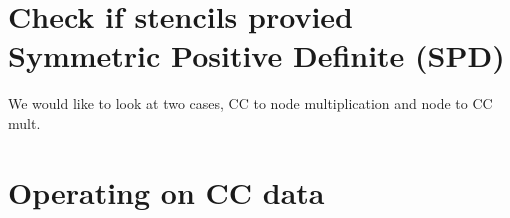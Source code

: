 \documentclass[landscape]{article}
\begin{document}
\doublespacing
\MOONSTITLE

\section{Check if stencils provied Symmetric Positive Definite (SPD)}

We would like to look at two cases, CC to node multiplication and node to CC mult.

\section{Operating on CC data}
\end{document}
